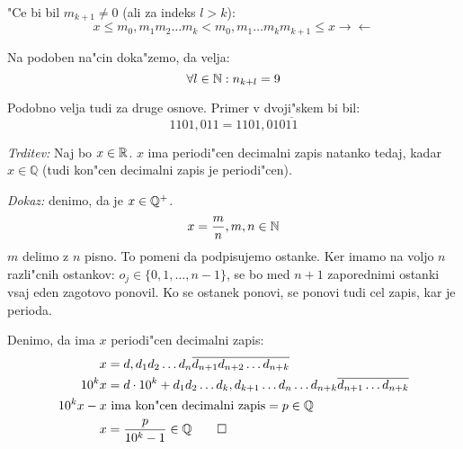 \begin{itemize}
	"Ce bi bil $m_{k+1} \neq 0$ (ali za indeks $l > k$):
	\begin{equation*}
		x \leq m_0,m_1m_2\ldots m_k < m_0,m_1 \ldots m_km_{k+1} \leq x \rightarrow \leftarrow
	\end{equation*}
	
	Na podoben na"cin doka"zemo, da velja:
	\begin{equation*}
	\forall l \in \mathbb{N}: n_{k+l} = 9
	\end{equation*}
\end{itemize}

Podobno velja tudi za druge osnove. Primer v dvoji"skem bi bil:
\begin{equation*}
1101,011 = 1101,010\overline{11}
\end{equation*}

\emph{Trditev:} Naj bo $x \in \mathbb{R}$. $x$ ima periodi"cen decimalni zapis natanko tedaj, kadar $x \in \mathbb{Q}$ (tudi kon"cen decimalni zapis je periodi"cen).

\emph{Dokaz:} denimo, da je $x \in \mathbb{Q}^+$.
\begin{equation*}
x = \dfrac{m}{n}, m, n \in \mathbb{N}
\end{equation*}
$m$ delimo z $n$ pisno. To pomeni da podpisujemo ostanke. Ker imamo na voljo $n$ razli"cnih ostankov: $o_j \in \{0, 1, \ldots, n-1\}$, se bo med $n+1$ zaporednimi ostanki vsaj eden zagotovo ponovil. Ko se ostanek ponovi, se ponovi tudi cel zapis, kar je perioda.

Denimo, da ima $x$ periodi"cen decimalni zapis:
\begin{align*}
x &= d,d_1d_2\ldots d_n \overline{d_{n+1} d_{n+2}\ldots d_{n+k}}\\
10^k x &= d \cdot 10^k + d_1d_2\ldots d_k, d_{k+1}\ldots d_n \ldots d_{n+k} \overline{d_{n+1} \ldots d_{n+k}}\\
10^kx-x &\text{ ima kon"cen decimalni zapis} = p \in \mathbb{Q}\\
x &= \dfrac{p}{10^k-1} \in \mathbb{Q} \qed
\end{align*}